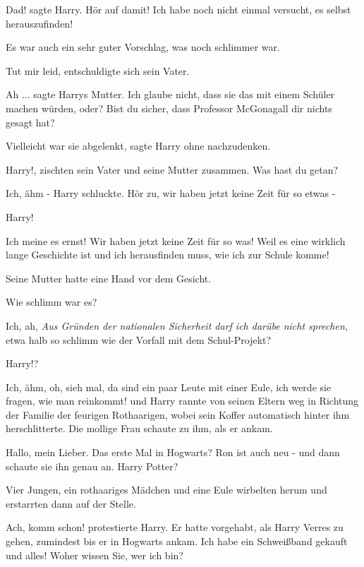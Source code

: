 \glqq{}Dad!\grqq{} sagte Harry. \glqq{}Hör auf damit! Ich habe noch nicht einmal
versucht, es selbst herauszufinden!\grqq{}

Es war auch ein sehr guter Vorschlag, was noch schlimmer war.

\glqq{}Tut mir leid\grqq{}, entschuldigte sich sein Vater.

\glqq{}Ah ...\grqq{} sagte Harrys Mutter. \glqq{}Ich glaube nicht, dass sie das
mit einem Schüler machen würden, oder? Bist du sicher, dass Professor McGonagall
dir nichts gesagt hat?\grqq{}

\glqq{}Vielleicht war sie abgelenkt\grqq{}, sagte Harry ohne nachzudenken.

\glqq{}Harry!\grqq{}, zischten sein Vater und seine Mutter zusammen. \glqq{}Was
hast du getan?\grqq{}

\glqq{}Ich, ähm -\grqq{} Harry schluckte. \glqq{}Hör zu, wir haben jetzt keine
Zeit für so etwas -\grqq{}

\glqq{}Harry!\grqq{}

\glqq{}Ich meine es ernst! Wir haben jetzt keine Zeit für so was! Weil es eine
wirklich lange Geschichte ist und ich herausfinden muss, wie ich zur Schule
komme!\grqq{}

Seine Mutter hatte eine Hand vor dem Gesicht.

\glqq{}Wie schlimm war es?\grqq{}

\glqq{}Ich, ah\grqq{}, \emph{Aus Gründen der nationalen Sicherheit darf ich
darübe nicht sprechen,} \glqq{}etwa halb so schlimm wie der Vorfall mit dem
Schul-Projekt?\grqq{}

\glqq{}Harry!?\grqq{}

\glqq{}Ich, ähm, oh, sieh mal, da sind ein paar Leute mit einer Eule, ich werde
sie fragen, wie man reinkommt!\grqq{} und Harry rannte von seinen Eltern weg in
Richtung der Familie der feurigen Rothaarigen, wobei sein Koffer automatisch
hinter ihm herschlitterte. Die mollige Frau schaute zu ihm, als er ankam.

\glqq{}Hallo, mein Lieber. Das erste Mal in Hogwarts? Ron ist auch neu -\grqq{}
und dann schaute sie ihn genau an. \glqq{}Harry Potter?\grqq{}

Vier Jungen, ein rothaariges Mädchen und eine Eule wirbelten herum und
erstarrten dann auf der Stelle.

\glqq{}Ach, komm schon!\grqq{} protestierte Harry. Er hatte vorgehabt, als Harry
Verres zu gehen, zumindest bis er in Hogwarts ankam. \glqq{}Ich habe ein
Schweißband gekauft und alles! Woher wissen Sie, wer ich bin?\grqq{}


